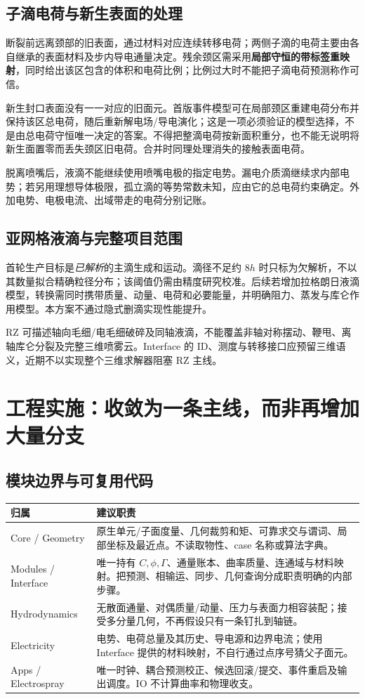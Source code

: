 \documentclass[11pt,a4paper]{article}
\begin{document}
\subsection{子滴电荷与新生表面的处理}
断裂前远离颈部的旧表面，通过材料对应连续转移电荷；两侧子滴的电荷主要由各自继承的表面材料及步内导电通量决定。残余颈区需采用\textbf{局部守恒的带标签重映射}，同时给出该区包含的体积和电荷比例；比例过大时不能把子滴电荷预测称作可信。

新生封口表面没有一一对应的旧面元。首版事件模型可在局部颈区重建电荷分布并保持该区总电荷，随后重新解电场/导电演化；这是一项必须验证的模型选择，不是由总电荷守恒唯一决定的答案。不得把整滴电荷按新面积重分，也不能无说明将新生面置零而丢失颈区旧电荷。合并时同理处理消失的接触表面电荷。

脱离喷嘴后，液滴不能继续使用喷嘴电极的指定电势。漏电介质滴继续求内部电势；若另用理想导体极限，孤立滴的等势常数未知，应由它的总电荷约束确定。外加电势、电极电流、出域带走的电荷分别记账。

\subsection{亚网格液滴与完整项目范围}
首轮生产目标是\emph{已解析}的主滴生成和运动。滴径不足约 $8h$ 时只标为欠解析，不以其数量拟合精确粒径分布；该阈值仍需由精度研究校准。后续若增加拉格朗日液滴模型，转换需同时携带质量、动量、电荷和必要能量，并明确阻力、蒸发与库仑作用模型。本方案不通过隐式删滴实现性能提升。

RZ 可描述轴向毛细/电毛细破碎及同轴液滴，不能覆盖非轴对称摆动、鞭甩、离轴库仑分裂及完整三维喷雾云。Interface 的 ID、测度与转移接口应预留三维语义，近期不以实现整个三维求解器阻塞 RZ 主线。

\section{工程实施：收敛为一条主线，而非再增加大量分支}
\subsection{模块边界与可复用代码}
\begin{longtable}{L{31mm}L{118mm}}
\toprule 归属 & 建议职责\\\midrule\endhead
Core / Geometry & 原生单元/子面度量、几何裁剪和矩、可靠求交与谓词、局部坐标及最近点。不读取物性、case 名称或算法字典。\\
Modules / Interface & 唯一持有 $C,\phi,\Gamma$、通量账本、曲率质量、连通域与材料映射。把预测、相输运、同步、几何查询分成职责明确的内部步骤。\\
Hydrodynamics & 无散面通量、对偶质量/动量、压力与表面力相容装配；接受多分量几何，不再假设只有一条钉扎到轴链。\\
Electricity & 电势、电荷总量及其历史、导电源和边界电流；使用 Interface 提供的材料映射，不自行通过点序号猜父子面元。\\
Apps / Electrospray & 唯一时钟、耦合预测校正、候选回滚/提交、事件重启及输出调度。IO 不计算曲率和物理收支。\\\bottomrule
\end{longtable}
\end{document}
